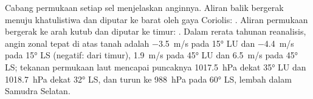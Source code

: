 Cabang permukaan setiap sel menjelaskan anginnya. Aliran balik  bergerak menuju khatulistiwa dan diputar ke barat oleh gaya Coriolis: . Aliran permukaan  bergerak ke arah kutub dan diputar ke timur: . Dalam rerata tahunan reanalisis, angin zonal tepat di atas tanah adalah \qty{-3.5}{m/s} pada \ang{15} LU dan \qty{-4.4}{m/s} pada \ang{15} LS (negatif: dari timur), \qty{+1.9}{m/s} pada \ang{45} LU dan \qty{+6.5}{m/s} pada \ang{45} LS; tekanan permukaan laut mencapai puncaknya \qty{1017.5}{hPa} dekat \ang{35} LU dan \qty{1018.7}{hPa} dekat \ang{32} LS, dan turun ke \qty{988}{hPa} pada \ang{60} LS, lembah dalam Samudra Selatan.

